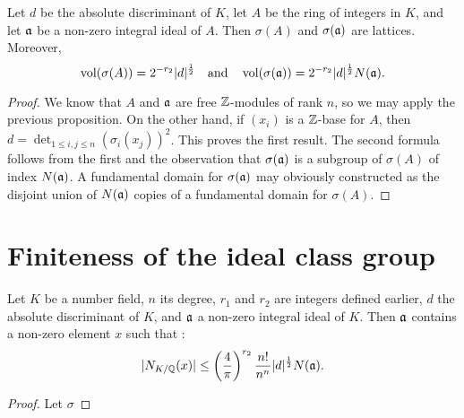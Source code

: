 \begin{prop}
  Let $d$ be the absolute discriminant of $K$, let $A$ be the ring of integers in $K$, and let $\mathfrak{a}$ be a non-zero integral ideal of $A$. Then $\sigma(A)$ and $\sigma(\mathfrak{a})$ are lattices. Moreover,
  \[\operatorname{vol}(\sigma(A)) = 2^{-r_2}|d|^{\frac12}\quad\text{and}\quad \operatorname{vol}(\sigma(\mathfrak{a})) = 2^{-r_2}|d|^{\frac12}N(\mathfrak{a}).\]
\end{prop}

\begin{proof}
  We know that $A$ and $\mathfrak{a}$ are free $\mathbb{Z}$-modules of rank $n$, so we may apply the previous proposition. On the other hand, if $(x_i)$ is a $\mathbb{Z}$-base for $A$, then $d = \det_{1\leq i,j\leq n}(\sigma_{i}(x_j))^2$. This proves the first result. The second formula follows from the first and the observation that $\sigma(\mathfrak{a})$ is a subgroup of $\sigma(A)$ of index $N(\mathfrak{a})$. A fundamental domain for $\sigma(\mathfrak{a})$ may obviously constructed as the disjoint union of $N(\mathfrak{a})$ copies of a fundamental domain for $\sigma(A)$.
\end{proof}

\section{Finiteness of the ideal class group}

\begin{prop}
  Let $K$ be a number field, $n$ its degree, $r_1$ and $r_2$ are integers defined earlier, $d$ the absolute discriminant of $K$, and $\mathfrak{a}$ a non-zero integral ideal of $K$. Then $\mathfrak{a}$ contains a non-zero element $x$ such that :
  \[|N_{K/\mathbb{Q}}(x)|\leq \left(\frac{4}{\pi}\right)^{r_2}\frac{n!}{n^n}|d|^{\frac12}N(\mathfrak{a}).\]
\end{prop}
\begin{proof}
  Let $\sigma$
\end{proof}
